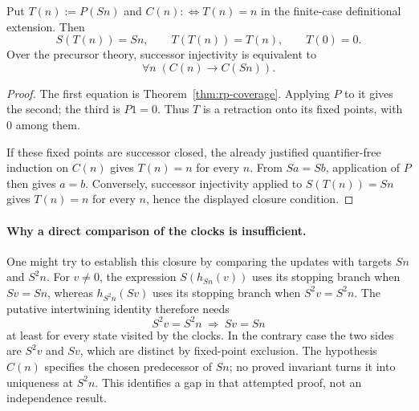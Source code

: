 \begin{lemma}
\label{lem:rp-retraction}
Put $T(n):=P(Sn)$ and $C(n):\!\iff T(n)=n$ in the finite-case
definitional extension. Then
\[
 S(T(n))=Sn,\qquad T(T(n))=T(n),\qquad T(0)=0.
\]
Over the precursor theory, successor injectivity is equivalent to
\[
                         \forall n\;(C(n)\to C(Sn)).
\]
\end{lemma}
\begin{proof}
The first equation is Theorem~\ref{thm:rp-coverage}. Applying $P$ to it
gives the second; the third is $P1=0$. Thus $T$ is a retraction onto
its fixed points, with $0$ among them.

If these fixed points are successor closed, the already justified
quantifier-free induction on $C(n)$ gives $T(n)=n$ for every $n$.
From $Sa=Sb$, application of $P$ then gives $a=b$. Conversely,
successor injectivity applied to $S(T(n))=Sn$ gives $T(n)=n$ for
every $n$, hence the displayed closure condition.
\end{proof}

\paragraph{Why a direct comparison of the clocks is insufficient.}
One might try to establish this closure by comparing the updates with
targets $Sn$ and $S^2n$. For $v\ne0$, the expression $S(h_{Sn}(v))$
uses its stopping branch when $Sv=Sn$, whereas $h_{S^2n}(Sv)$ uses
its stopping branch when $S^2v=S^2n$. The putative intertwining
identity therefore needs
\[
                         S^2v=S^2n\ \Longrightarrow\ Sv=Sn
\]
at least for every state visited by the clocks. In the contrary case
the two sides are $S^2v$ and $Sv$, which are distinct by fixed-point
exclusion. The hypothesis $C(n)$ specifies the chosen predecessor of
$Sn$; no proved invariant turns it into uniqueness at $S^2n$.
This identifies a gap in that attempted proof, not an independence
result.
